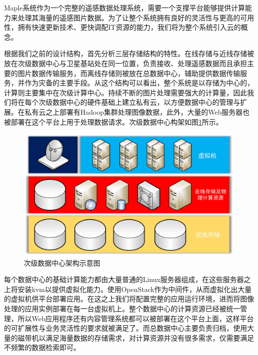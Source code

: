 \documentclass{article}
\begin{document}
Maple系统作为一个完整的遥感数据处理系统，需要一个支撑平台能够提供计算能力来处理其海量的遥感图片数据。为了让整个系统拥有良好的灵活性与更高的可用性，拥有快速更新技术、更快调配IT资源的能力，我们将为整个系统引入云的概念。

根据我们之前的设计结构，首先分析三层存储结构的特性。在线存储与近线存储被放在次级数据中心与卫星基站处在同一位置，负责接收、处理遥感数据而且承担主要的图片数据传输服务，而离线存储则被放在总数据中心，辅助提供数据传输服务，并作为灾备的主要手段。从这个结构可以看出，整个系统是以存储为中心的，计算则主要集中在次级计算中心。持续不断的图片处理需要强大的计算量，因此我们将在每个次级数据中心的硬件基础上建立私有云，以方便数据中心的管理与扩展。在私有云之上部署有Hadoop集群处理图像数据，此外，大量的Web服务器也被部署在这个平台上用于处理数据请求。次级数据中心构架如图\ref{sub}所示。

\begin{figure}[H]
\centering 
\includegraphics[width=\textwidth]{sub.jpg}
\caption{次级数据中心架构示意图}
\label{sub}
\end{figure}

每个数据中心的基础计算能力都由大量普通的Linux服务器组成，在这些服务器之上将安装kvm以提供虚拟化能力。使用OpenStack作为中间件，从而虚拟化出大量的虚拟机供平台部署应用。在这之上我们将配置完整的应用运行环境，进而将图像处理的应用实例部署在每一台虚拟机上。整个数据中心的计算资源已经被统一管理，所以Web应用程序还有内容管理系统都可以被部署在这个平台上面，这样平台的可扩展性与业务灵活性的要求就被满足了。而总数据中心主要负责归档，使用大量的磁带机以满足海量数据的存储需求，对计算资源并没有很多需求，仅需要满足不频繁的数据检索即可。
\end{document}
